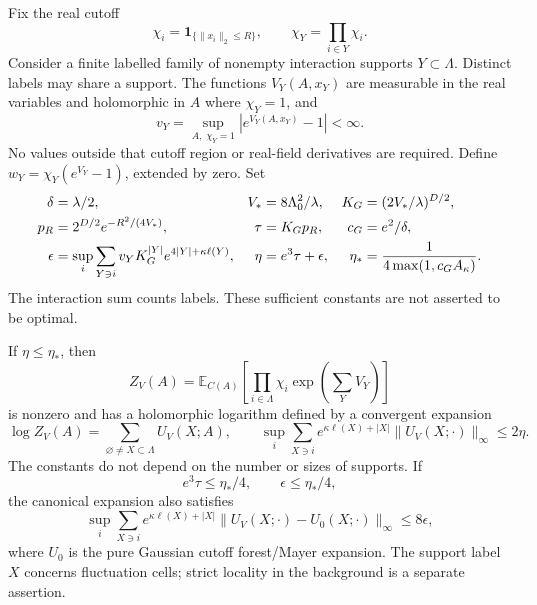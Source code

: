 Fix the real cutoff
\[
 \chi_i=\mathbf1_{\{\|x_i\|_2\le R\}},\qquad
 \chi_Y=\prod_{i\in Y}\chi_i.
\]
Consider a finite labelled family of nonempty interaction supports
$Y\subset\Lambda$. Distinct labels may share a support.
The functions $V_Y(A,x_Y)$ are measurable in the real variables and
holomorphic in $A$ where $\chi_Y=1$, and
\begin{equation}\label{oi-multiplier}
 v_Y=\sup_{A,\;\chi_Y=1}|e^{V_Y(A,x_Y)}-1|<\infty.
\end{equation}
No values outside that cutoff region or real-field derivatives are
required. Define $w_Y=\chi_Y(e^{V_Y}-1)$, extended by zero.
Set
\begin{align}
 \delta&=\lambda/2,&
 V_*&=8\Lambda_0^2/\lambda,&
 K_G&=(2V_*/\lambda)^{D/2},\notag\\
 p_R&=2^{D/2}e^{-R^2/(4V_*)},&
 \tau&=K_Gp_R,& c_G&=e^2/\delta,                 \label{oi-constants}\\
 \epsilon&=\sup_i\sum_{Y\ni i}
      v_Y K_G^{|Y|}e^{4|Y|+\kappa\ell(Y)},&
 \eta&=e^3\tau+\epsilon,&
 \eta_*&=\frac1{4\max(1,c_GA_\kappa)}.           \label{oi-smallness}
\end{align}
The interaction sum counts labels. These sufficient constants are
not asserted to be optimal.

\begin{theorem}
\label{oi-theorem}
If $\eta\le\eta_*$, then
\[
 Z_V(A)=\mathbb E_{C(A)}
   \left[\prod_{i\in\Lambda}\chi_i
              \exp\left(\sum_YV_Y\right)\right]
\]
is nonzero and has a holomorphic logarithm defined by a convergent
expansion
\begin{equation}\label{oi-log}
 \log Z_V(A)=\sum_{\varnothing\ne X\subset\Lambda}U_V(X;A),\qquad
 \sup_i\sum_{X\ni i}e^{\kappa\ell(X)+|X|}
       \|U_V(X;\cdot)\|_\infty\le2\eta .
\end{equation}
The constants do not depend on the number or sizes of supports.
If
\begin{equation}\label{oi-quarter}
 e^3\tau\le\eta_*/4,\qquad \epsilon\le\eta_*/4,
\end{equation}
the canonical expansion also satisfies
\begin{equation}\label{oi-difference}
 \sup_i\sum_{X\ni i}e^{\kappa\ell(X)+|X|}
      \|U_V(X;\cdot)-U_0(X;\cdot)\|_\infty
 \le8\epsilon ,
\end{equation}
where $U_0$ is the pure Gaussian cutoff forest/Mayer expansion.
The support label $X$ concerns fluctuation cells; strict locality
in the background is a separate assertion.
\end{theorem}

